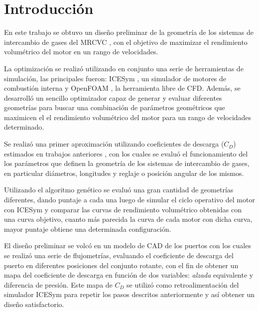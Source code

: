 \chapter{Introducción}

En este trabajo se obtuvo un diseño preliminar de la geometría de los  sistemas
de intercambio de gases del MRCVC \cite{toth}, con el objetivo de maximizar el
rendimiento volumétrico del motor en un rango de velocidades.

La optimización se realizó utilizando en conjunto una serie de herramientas de
simulación, las principales fueron: ICESym \cite{icesym}, un simulador de
motores de combustión interna y OpenFOAM \cite{openfoam}, la herramienta libre
de CFD.
%
Además, se desarrolló un sencillo optimizador capaz de generar y evaluar
diferentes geometrías para buscar una combinación de parámetros geométricos que
maximicen el el rendimiento volumétrico del motor para un rango de velocidades
determinado.


Se realizó una primer aproximación utilizando coeficientes de descarga ($C_{D}$)
estimados en trabajos anteriores \cite{lopez13}, con los cuales se evaluó el
funcionamiento del los parámetros que definen la geometría de los sistemas de
intercambio de gases, en particular diámetros, longitudes y reglaje o posición
angular de los mismos.

Utilizando el algoritmo genético se evaluó una gran cantidad de geometrías
diferentes, dando puntaje a cada una luego de simular el ciclo operativo del
motor con ICESym y comparar las curvas de rendimiento volumétrico obtenidas con
una curva objetivo, cuanto más parecida la curva de cada motor con dicha curva,
mayor puntaje obtiene una determinada configuración.


El diseño preliminar se volcó en un modelo de CAD de los puertos con los cuales
se realizó una serie de flujometrías, evaluando el coeficiente de descarga del
puerto en diferentes posiciones del conjunto rotante, con el fin de obtener un
mapa del coeficiente de descarga en función de dos variables: \emph{alzada}
equivalente y diferencia de presión.
%
Este mapa de $C_{D}$ se utilizó como retroalimentación del simulador ICESym
para repetir los pasos descritos anteriormente y así obtener un diseño
satisfactorio.

